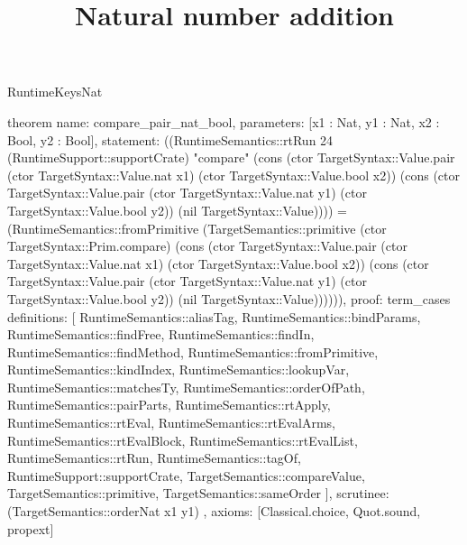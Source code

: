 \begin{lexlean}{RuntimeKeysNat}
\title{Natural number addition}
\begin{semanticmodule}
theorem{
  name: compare_pair_nat_bool,
  parameters: [x1 : Nat, y1 : Nat, x2 : Bool, y2 : Bool],
  statement: ((RuntimeSemantics::rtRun 24 (RuntimeSupport::supportCrate) "compare" (cons (ctor TargetSyntax::Value.pair (ctor TargetSyntax::Value.nat x1) (ctor TargetSyntax::Value.bool x2)) (cons (ctor TargetSyntax::Value.pair (ctor TargetSyntax::Value.nat y1) (ctor TargetSyntax::Value.bool y2)) (nil TargetSyntax::Value)))) = (RuntimeSemantics::fromPrimitive (TargetSemantics::primitive (ctor TargetSyntax::Prim.compare) (cons (ctor TargetSyntax::Value.pair (ctor TargetSyntax::Value.nat x1) (ctor TargetSyntax::Value.bool x2)) (cons (ctor TargetSyntax::Value.pair (ctor TargetSyntax::Value.nat y1) (ctor TargetSyntax::Value.bool y2)) (nil TargetSyntax::Value)))))),
  proof: term_cases{
    definitions: [
      RuntimeSemantics::aliasTag,
      RuntimeSemantics::bindParams,
      RuntimeSemantics::findFree,
      RuntimeSemantics::findIn,
      RuntimeSemantics::findMethod,
      RuntimeSemantics::fromPrimitive,
      RuntimeSemantics::kindIndex,
      RuntimeSemantics::lookupVar,
      RuntimeSemantics::matchesTy,
      RuntimeSemantics::orderOfPath,
      RuntimeSemantics::pairParts,
      RuntimeSemantics::rtApply,
      RuntimeSemantics::rtEval,
      RuntimeSemantics::rtEvalArms,
      RuntimeSemantics::rtEvalBlock,
      RuntimeSemantics::rtEvalList,
      RuntimeSemantics::rtRun,
      RuntimeSemantics::tagOf,
      RuntimeSupport::supportCrate,
      TargetSemantics::compareValue,
      TargetSemantics::primitive,
      TargetSemantics::sameOrder
    ],
    scrutinee: (TargetSemantics::orderNat x1 y1)
  },
  axioms: [Classical.choice, Quot.sound, propext]
}


\end{semanticmodule}
\end{lexlean}
